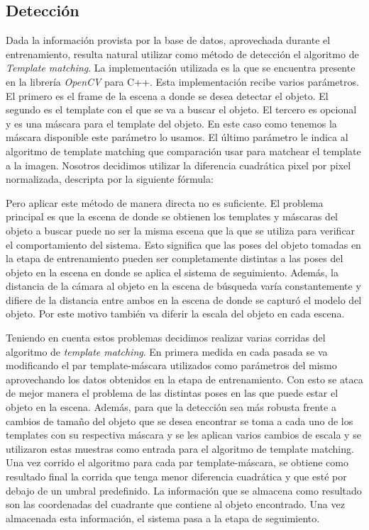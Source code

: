 \subsection{Detección}
Dada la información provista por la base de datos, aprovechada durante el entrenamiento, resulta natural utilizar como método de detección el algoritmo de \textit{Template matching}.  La implementación utilizada es la que se encuentra presente en la librería \textit{OpenCV} para C++. Esta implementación recibe varios parámetros. El primero es el frame de la escena a donde se desea detectar el objeto. El segundo es el template con el que se va a buscar el objeto. El tercero es opcional y es una máscara para el template del objeto. En este caso como tenemos la máscara disponible este parámetro lo usamos. El último parámetro le indica al algoritmo de template matching que comparación usar para matchear el template a la imagen. Nosotros decidimos utilizar la diferencia cuadrática pixel por pixel normalizada, descripta por la siguiente fórmula:


Pero aplicar este método de manera directa no es suficiente. El problema principal es que la escena de donde se obtienen los templates y máscaras del objeto a buscar puede no ser la misma escena que la que se utiliza para verificar el comportamiento del sistema. Esto significa que las poses del objeto tomadas en la etapa de entrenamiento pueden ser completamente distintas a las poses del objeto en la escena en donde se aplica el sistema de seguimiento. Además, la distancia de la cámara al objeto en la escena de búsqueda varía constantemente y difiere de la distancia entre ambos en la escena de donde se capturó el modelo del objeto. Por este motivo también va diferir la escala del objeto en cada escena.

Teniendo en cuenta estos problemas decidimos realizar varias corridas del algoritmo de \textit{template matching}. En primera medida en cada pasada se va modificando el par template-máscara utilizados como parámetros del mismo aprovechando los datos obtenidos en la etapa de entrenamiento. Con esto se ataca de mejor manera el problema de las distintas poses en las que puede estar el objeto en la escena. Además, para que la detección sea más robusta frente a cambios de tamaño del objeto que se desea encontrar se toma a cada uno de los templates con su respectiva máscara y se les aplican varios cambios de escala y se utilizaron estas muestras como entrada para el algoritmo de template matching. Una vez corrido el algoritmo para cada par template-máscara, se obtiene como resultado final la corrida que tenga menor diferencia cuadrática y que esté por debajo de un umbral predefinido. La información que se almacena como resultado son las coordenadas del cuadrante que contiene al objeto encontrado. Una vez almacenada esta información, el sistema pasa a la etapa de seguimiento.

